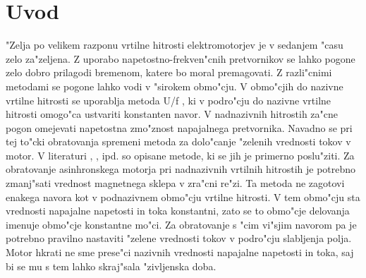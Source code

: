 \documentclass[journal,a4paper,twoside]{sty/IEEEtran}
\begin{document}

\section{Uvod}


"Zelja po velikem razponu vrtilne hitrosti elektromotorjev je v sedanjem "casu zelo za"zeljena. Z uporabo napetostno-frekven"cnih pretvornikov se lahko pogone zelo dobro prilagodi bremenom, katere bo moral premagovati. Z razli"cnimi metodami se pogone lahko vodi v "sirokem obmo"cju. V obmo"cjih do nazivne vrtilne hitrosti se uporablja metoda U/f \cite{servopogoni}, ki v podro"cju do nazivne vrtilne hitrosti omogo"ca ustvariti konstanten navor. 
V nadnazivnih hitrostih za"cne pogon omejevati napetostna zmo"znost napajalnega pretvornika.  Navadno se pri tej to"cki obratovanja spremeni metoda za dolo"canje "zelenih vrednosti tokov v motor. V literaturi \cite{servopogoni}, \cite{miljavc}, \cite{vas} ipd. so opisane metode, ki se jih je primerno poslu"ziti. Za obratovanje asinhronskega motorja pri nadnazivnih vrtilnih hitrostih je potrebno zmanj"sati vrednost magnetnega sklepa v zra"cni re"zi. Ta metoda ne zagotovi enakega navora kot v podnazivnem obmo"cju vrtilne hitrosti. V tem obmo"cju sta vrednosti napajalne napetosti in toka konstantni, zato se to obmo"cje delovanja imenuje obmo"cje konstantne mo"ci. Za obratovanje s "cim vi"sjim navorom pa je potrebno pravilno nastaviti "zelene vrednosti tokov v podro"cju slabljenja polja. Motor hkrati ne sme prese"ci nazivnih vrednosti napajalne napetosti in toka, saj bi se mu s tem lahko skraj"sala "zivljenska doba. 
\end{document}
